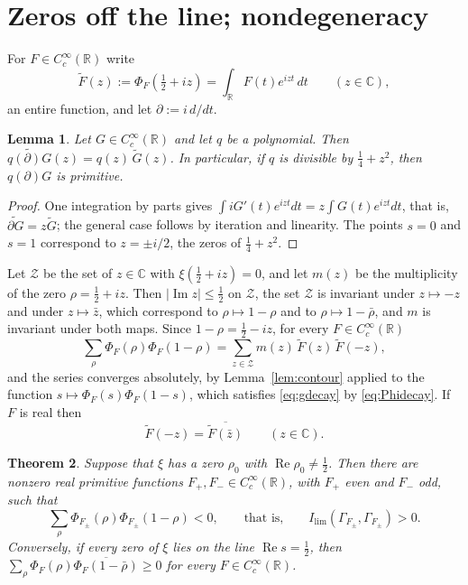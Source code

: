 \documentclass[11pt]{amsart}
\newtheorem{theorem}{Theorem}[section]
\newtheorem{lemma}[theorem]{Lemma}
\theoremstyle{remark}
\numberwithin{equation}{section}
\newcommand{\C}{\mathbb C}
\newcommand{\R}{\mathbb R}
\newcommand{\Rel}{\operatorname{Re}}
\newcommand{\Iml}{\operatorname{Im}}
\newcommand{\Il}{I_{\lim}}
\begin{document}
\section{Zeros off the line; nondegeneracy}
\label{sec:sufficiency}

For $F\in C_c^\infty(\R)$ write
\begin{equation}
\label{eq:tilde}
  \widetilde F(z):=\Phi_F(\tfrac12+iz)=\int_\R F(t)e^{izt}\,dt
  \qquad(z\in\C),
\end{equation}
an entire function, and let $\partial:=i\,d/dt$.

\begin{lemma}
\label{lem:Pi}
Let $G\in C_c^\infty(\R)$ and let $q$ be a polynomial.  Then
$\widetilde{q(\partial)G}(z)=q(z)\,\widetilde G(z)$.  In particular, if $q$
is divisible by $\tfrac14+z^2$, then $q(\partial)G$ is primitive.
\end{lemma}

\begin{proof}
One integration by parts gives
$\int iG'(t)e^{izt}dt=z\int G(t)e^{izt}dt$, that is,
$\widetilde{\partial G}=z\widetilde G$; the general case follows by iteration
and linearity.  The points $s=0$ and $s=1$ correspond to $z=\pm i/2$, the
zeros of $\tfrac14+z^2$.
\end{proof}

Let $\mathcal Z$ be the set of $z\in\C$ with $\xi(\tfrac12+iz)=0$, and let
$m(z)$ be the multiplicity of the zero $\rho=\tfrac12+iz$.  Then
$|\Iml z|\le\tfrac12$ on $\mathcal Z$, the set $\mathcal Z$ is invariant
under $z\mapsto-z$ and under $z\mapsto\bar z$, which correspond to
$\rho\mapsto1-\rho$ and to $\rho\mapsto1-\bar\rho$, and $m$ is invariant
under both maps.  Since $1-\rho=\tfrac12-iz$, for every $F\in C_c^\infty(\R)$
\begin{equation}
\label{eq:zsum}
  \sum_\rho\Phi_F(\rho)\Phi_F(1-\rho)
  =\sum_{z\in\mathcal Z}m(z)\,\widetilde F(z)\,\widetilde F(-z),
\end{equation}
and the series converges absolutely, by Lemma~\ref{lem:contour} applied to
the function $s\mapsto\Phi_F(s)\Phi_F(1-s)$, which satisfies
\eqref{eq:gdecay} by \eqref{eq:Phidecay}.  If $F$ is real then
\begin{equation}
\label{eq:realF}
  \widetilde F(-z)=\overline{\widetilde F(\bar z)}\qquad(z\in\C).
\end{equation}

\begin{theorem}
\label{thm:sufficiency}
Suppose that $\xi$ has a zero $\rho_0$ with $\Rel\rho_0\ne\tfrac12$.  Then
there are nonzero real primitive functions $F_+,F_-\in C_c^\infty(\R)$, with
$F_+$ even and $F_-$ odd, such that
\begin{equation}
\label{eq:negative}
  \sum_\rho\Phi_{F_\pm}(\rho)\Phi_{F_\pm}(1-\rho)<0 ,
  \qquad\text{that is,}\qquad \Il(\Gamma_{F_\pm},\Gamma_{F_\pm})>0 .
\end{equation}
Conversely, if every zero of $\xi$ lies on the line $\Rel s=\tfrac12$, then
$\sum_\rho\Phi_F(\rho)\overline{\Phi_F(1-\bar\rho)}\ge0$ for every
$F\in C_c^\infty(\R)$.
\end{theorem}
\end{document}
